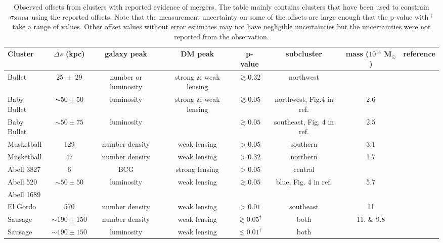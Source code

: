 \begin{table*}
	 \begin{center}
	 \caption{Observed offsets from clusters with reported evidence of mergers.
		 The table mainly contains clusters that have been used to constrain
		 $\sigma_{\rm SIDM}$ using the reported offsets.
	 Note that the measurement uncertainty on some of the offsets are large enough that the
	 p-value with $^\dagger$ take a range of values. Other offset values without
	 error estimates may not have negligible uncertainties but the uncertainties were
	 not reported from the observation. 
	 \label{tab:offset_results}} 
	 \begin{tabular}{@{}lccccccc@{}}
	 \hline 
	 Cluster & $\Delta s$ (kpc) & galaxy peak & DM peak &  p-value & subcluster &
	 mass ($10^{14}$ M$_\odot$)  &  reference\\
	 \hline
	 Bullet  & 25$~\pm~29$ & number or luminosity & strong \& weak lensing & $\gtrsim 0.32$ &
	 northwest &  & \citealt{Randall2008d}\\
	 Baby Bullet & $\sim 50 \pm 50 $  & luminosity & strong \& weak lensing &
	 $\gtrsim 0.05 $ & northwest, Fig.4 in ref. & 2.6 & \citealt{Bradac2008} \\
	 Baby Bullet & $\sim 50 \pm 75 $ & luminosity & & $\gtrsim 0.05 $& southeast,
	 Fig. 4 in ref. & 2.5 & \citealt{Bradac2008} \\
	 Musketball & 129 & number density & weak lensing & $>0.05$ & southern & 3.1 
	 & \citealt{Dawson2013}\\
	 Musketball & 47 & number density & weak lensing & $>0.32$ &northern & 1.7 &  
	  \citealt{Dawson2013} \\
	 Abell 3827 & 6 & BCG & strong lensing & $> 0.05$ & central & & \citealt{Williams2011a}\\ 
	 Abell 520 & $\sim 50 \pm 50$ & luminosity & weak lensing & $\gtrsim 0.05$ & blue, 
		Fig. 4 in ref. & 5.7 & \citealt{Clowe2012} \\
	 Abell 1689  & & & & & &  & \citealt{Mohammed2014} \\
	 El Gordo & 570 & number density & weak lensing & $>0.01$ & southeast & 11  &\citealt{Jee2014} \\
	 Sausage & $\sim190 \pm 150$ & number density & weak lensing & $\gtrsim 0.05^\dagger$ & both
	 & 11. \& 9.8 &\citealt{Jee2015}\\ 
	 Sausage & $\sim190 \pm 150 $  & luminosity & weak lensing & $\lesssim
	 0.01^\dagger$ & both
	 &  &\citealt{Jee2015}\\ 
	 \hline
	 \end{tabular} 
	 \end{center} 
\end{table*}


